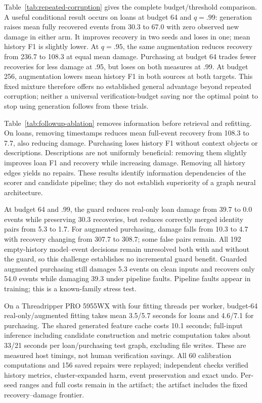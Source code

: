 Table~\ref{tab:repeated-corruption} gives the complete budget/threshold comparison. A useful conditional result occurs on loans at budget 64 and $q=.99$: generation raises mean fully recovered events from 30.3 to 67.0 with zero observed new damage in either arm. It improves recovery in two seeds and loses in one; mean history F1 is slightly lower. At $q=.95$, the same augmentation reduces recovery from 236.7 to 108.3 at equal mean damage. Purchasing at budget 64 trades fewer recoveries for less damage at .95, but loses on both measures at .99. At budget 256, augmentation lowers mean history F1 in both sources at both targets. This fixed mixture therefore offers no established general advantage beyond repeated corruption; neither a universal verification-budget saving nor the optimal point to stop using generation follows from these trials.

Table~\ref{tab:followup-ablation} removes information before retrieval and refitting. On loans, removing timestamps reduces mean full-event recovery from 108.3 to 7.7, also reducing damage. Purchasing loses history F1 without context objects or descriptions. Descriptions are not uniformly beneficial: removing them slightly improves loan F1 and recovery while increasing damage. Removing all history edges yields no repairs. These results identify information dependencies of the scorer and candidate pipeline; they do not establish superiority of a graph neural architecture.

At budget 64 and .99, the guard reduces real-only loan damage from 39.7 to 0.0 events while preserving 30.3 recoveries, but reduces correctly merged identity pairs from 5.3 to 1.7. For augmented purchasing, damage falls from 10.3 to 4.7 with recovery changing from 307.7 to 308.7; some false pairs remain. All 192 empty-history model--event decisions remain unresolved both with and without the guard, so this challenge establishes no incremental guard benefit. Guarded augmented purchasing still damages 5.3 events on clean inputs and recovers only 54.0 events while damaging 39.3 under pipeline faults. Pipeline faults appear in training; this is a known-family stress test.

On a Threadripper PRO 5955WX with four fitting threads per worker, budget-64 real-only/augmented fitting takes mean 3.5/5.7 seconds for loans and 4.6/7.1 for purchasing. The shared generated feature cache costs 10.1 seconds; full-input inference including candidate construction and metric computation takes about 33/21 seconds per loan/purchasing test graph, excluding file writes. These are measured host timings, not human verification savings. All 60 calibration computations and 156 saved repairs were replayed; independent checks verified history metrics, cluster-expanded harm, event preservation and exact undo. Per-seed ranges and full costs remain in the artifact; the artifact includes the fixed recovery--damage frontier.
